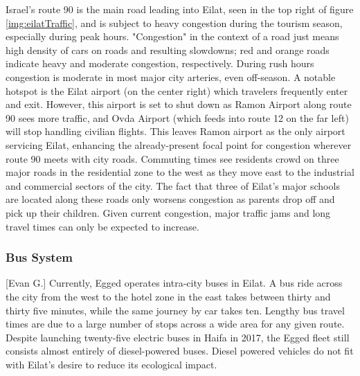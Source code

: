 \documentclass[12pt]{article}                               %
\begin{document}
Israel's route 90 is the main road leading into Eilat, seen in the top right of figure \ref{img:eilatTraffic}, and is subject to heavy congestion during the tourism season, especially during peak hours. "Congestion" in the context of a road just means high density of cars on roads and resulting slowdowns; red and orange roads indicate heavy and moderate congestion, respectively. During rush hours congestion is moderate in most major city arteries, even off-season. A notable hotspot is the Eilat airport (on the center right) which travelers frequently enter and exit. However, this airport is set to shut down as Ramon Airport along route 90 sees more traffic, and Ovda Airport (which feeds into route 12 on the far left) will stop handling civilian flights. This leaves Ramon airport as the only airport servicing Eilat, enhancing the already-present focal point for congestion wherever route 90 meets with city roads. Commuting times see residents crowd on three major roads in the residential zone to the west as they move east to the industrial and commercial sectors of the city. The fact that three of Eilat's major schools are located along these roads only worsens congestion as parents drop off and pick up their children. Given current congestion, major traffic jams and long travel times can only be expected to increase.

\subsubsection{Bus System}[Evan G.]
Currently, Egged operates intra-city buses in Eilat. A bus ride across the city from the west to the hotel zone in the east takes between thirty and thirty five minutes, while the same journey by car takes ten. Lengthy bus travel times are due to a large number of stops across a wide area for any given route. Despite launching twenty-five electric buses in Haifa in 2017, the Egged fleet still consists almost entirely of diesel-powered buses. Diesel powered vehicles do not fit with Eilat's desire to reduce its ecological impact.


\end{document}

